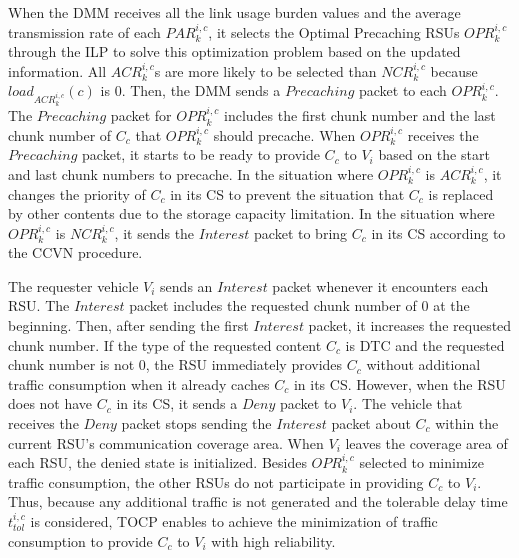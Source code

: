 \documentclass{ieeeaccess}
\begin{document}
When the DMM receives all the link usage burden values and the average transmission rate of each $PAR^{i,c}_{k}$, it selects the Optimal Precaching RSUs $OPR^{i,c}_{k}$ through the ILP to solve this optimization problem based on the updated information.
All $ACR^{i,c}_{k}$s are more likely to be selected than $NCR^{i,c}_{k}$ because $load_{ACR^{i,c}_{k}}(c)$ is 0.
Then, the DMM sends a $Precaching$ packet to each $OPR^{i,c}_{k}$.
The $Precaching$ packet for $OPR^{i,c}_{k}$ includes the first chunk number and the last chunk number of $C_{c}$ that $OPR^{i,c}_{k}$ should precache.
When $OPR^{i,c}_{k}$ receives the $Precaching$ packet, it starts to be ready to provide $C_{c}$ to $V_{i}$ based on the start and last chunk numbers to precache.
In the situation where $OPR^{i,c}_{k}$ is $ACR^{i,c}_{k}$, it changes the priority of $C_{c}$ in its CS to prevent the situation that $C_{c}$ is replaced by other contents due to the storage capacity limitation.
In the situation where $OPR^{i,c}_{k}$ is $NCR^{i,c}_{k}$, it sends the $Interest$ packet to bring $C_{c}$ in its CS according to the CCVN procedure.

The requester vehicle $V_{i}$ sends an $Interest$ packet whenever it encounters each RSU.
The $Interest$ packet includes the requested chunk number of 0 at the beginning.
Then, after sending the first $Interest$ packet, it increases the requested chunk number.
If the type of the requested content $C_{c}$ is DTC and the requested chunk number is not 0, the RSU immediately provides $C_{c}$ without additional traffic consumption when it already caches $C_{c}$ in its CS.
However, when the RSU does not have $C_{c}$ in its CS, it sends a $Deny$ packet to $V_{i}$.
The vehicle that receives the $Deny$ packet stops sending the $Interest$ packet about $C_{c}$ within the current RSU's communication coverage area.
When $V_{i}$ leaves the coverage area of each RSU, the denied state is initialized.
Besides $OPR^{i,c}_{k}$ selected to minimize traffic consumption, the other RSUs do not participate in providing $C_{c}$ to $V_{i}$.
Thus, because any additional traffic is not generated and the tolerable delay time $t^{i,c}_{tol}$ is considered, TOCP enables to achieve the minimization of traffic consumption to provide $C_{c}$ to $V_{i}$ with high reliability.
\end{document}
